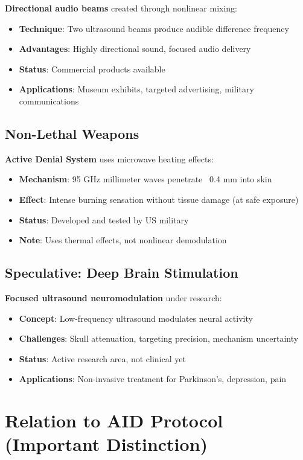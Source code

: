 \textbf{Directional audio beams} created through nonlinear mixing:
\begin{itemize}
\item \textbf{Technique}: Two ultrasound beams produce audible difference frequency
\item \textbf{Advantages}: Highly directional sound, focused audio delivery
\item \textbf{Status}: Commercial products available
\item \textbf{Applications}: Museum exhibits, targeted advertising, military communications
\end{itemize}

\subsection{Non-Lethal Weapons}

\textbf{Active Denial System} uses microwave heating effects:
\begin{itemize}
\item \textbf{Mechanism}: 95 GHz millimeter waves penetrate ~0.4 mm into skin
\item \textbf{Effect}: Intense burning sensation without tissue damage (at safe exposure)
\item \textbf{Status}: Developed and tested by US military
\item \textbf{Note}: Uses thermal effects, not nonlinear demodulation
\end{itemize}

\subsection{Speculative: Deep Brain Stimulation}

\textbf{Focused ultrasound neuromodulation} under research:
\begin{itemize}
\item \textbf{Concept}: Low-frequency ultrasound modulates neural activity
\item \textbf{Challenges}: Skull attenuation, targeting precision, mechanism uncertainty
\item \textbf{Status}: Active research area, not clinical yet
\item \textbf{Applications}: Non-invasive treatment for Parkinson's, depression, pain
\end{itemize}

\section{Relation to AID Protocol (Important Distinction)}

